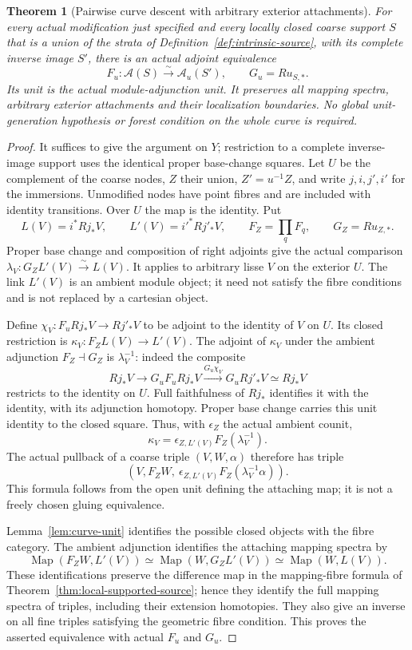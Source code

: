 \documentclass[11pt]{article}
\newtheorem{theorem}{Theorem}[section]
\theoremstyle{definition}
\theoremstyle{remark}
\begin{document}
\begin{theorem}[Pairwise curve descent with arbitrary exterior attachments]
\label{thm:curve-pairwise-descent}
For every actual modification just specified and every locally closed
coarse support $S$ that is a union of the strata of
Definition~\ref{def:intrinsic-source}, with its complete inverse image
$S'$, there is an
actual adjoint equivalence
\[
 F_u:\mathcal A(S)\xrightarrow{\sim}\mathcal A_u(S'),
 \qquad G_u=Ru_{S,*}.
\]
Its unit is the actual module-adjunction unit.  It preserves all
mapping spectra, arbitrary exterior attachments and their localization
boundaries.  No global unit-generation hypothesis or forest condition
on the whole curve is required.
\end{theorem}
\begin{proof}
It suffices to give the argument on $Y$; restriction to a complete
inverse-image support uses the identical proper base-change squares.
Let $U$ be the complement of the coarse nodes, $Z$ their union,
$Z'=u^{-1}Z$, and write $j,i,j',i'$ for the immersions.  Unmodified
nodes have point fibres and are included with identity transitions.
Over $U$ the map is the identity.  Put
\[
 L(V)=i^*Rj_*V,\qquad L'(V)=i'^*Rj'_*V,\qquad
 F_Z=\prod_q F_q,\qquad G_Z=Ru_{Z,*}.
\]
Proper base change and composition of right adjoints give the actual
comparison $\lambda_V:G_ZL'(V)\xrightarrow{\sim}L(V)$.
It applies to arbitrary lisse $V$ on the exterior $U$.
The link $L'(V)$ is an ambient module object; it need not satisfy
the fibre conditions and is not replaced by a cartesian object.

Define $\chi_V:F_uRj_*V\to Rj'_*V$ to be adjoint to the identity
of $V$ on $U$.  Its closed restriction is
$\kappa_V:F_ZL(V)\to L'(V)$.
The adjoint of $\kappa_V$ under the ambient adjunction
$F_Z\dashv G_Z$ is $\lambda_V^{-1}$: indeed the composite
\[
 Rj_*V\longrightarrow G_uF_uRj_*V
       \xrightarrow{G_u\chi_V}G_uRj'_*V\simeq Rj_*V
\]
restricts to the identity on $U$.  Full faithfulness of $Rj_*$
identifies it with the identity, with its adjunction homotopy.
Proper base change carries this unit identity to the closed square.
Thus, with $\epsilon_Z$ the actual ambient counit,
\[
 \kappa_V=\epsilon_{Z,L'(V)}F_Z(\lambda_V^{-1}).
\]
The actual pullback of a coarse triple $(V,W,\alpha)$ therefore has
triple
\[
 (V,F_ZW,\ \epsilon_{Z,L'(V)}F_Z(\lambda_V^{-1}\alpha)).
\]
This formula follows from the open unit defining the attaching map;
it is not a freely chosen gluing equivalence.

Lemma~\ref{lem:curve-unit} identifies the possible closed objects
with the fibre category.  The ambient adjunction identifies the
attaching mapping spectra by
\[
 \operatorname{Map}(F_ZW,L'(V))
  \simeq\operatorname{Map}(W,G_ZL'(V))
  \simeq\operatorname{Map}(W,L(V)).
\]
These identifications preserve the difference map in the mapping-fibre
formula of Theorem~\ref{thm:local-supported-source}; hence they
identify the full mapping spectra of triples, including their
extension homotopies.  They also give an inverse on all fine triples
satisfying the geometric fibre condition.  This proves the asserted
equivalence with actual $F_u$ and $G_u$.


\end{proof}
\end{document}
